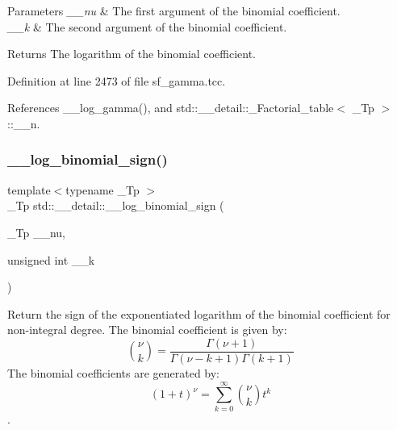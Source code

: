 \begin{DoxyParams}{Parameters}
{\em \+\_\+\+\_\+nu} & The first argument of the binomial coefficient. \\
\hline
{\em \+\_\+\+\_\+k} & The second argument of the binomial coefficient. \\
\hline
\end{DoxyParams}
\begin{DoxyReturn}{Returns}
The logarithm of the binomial coefficient. 
\end{DoxyReturn}


Definition at line 2473 of file sf\+\_\+gamma.\+tcc.



References \+\_\+\+\_\+log\+\_\+gamma(), and std\+::\+\_\+\+\_\+detail\+::\+\_\+\+Factorial\+\_\+table$<$ \+\_\+\+Tp $>$\+::\+\_\+\+\_\+n.

\mbox{\label{namespacestd_1_1____detail_aa89a8a5ced6325e1d64782f84e4ad95d}} 
\subsubsection{\texorpdfstring{\+\_\+\+\_\+log\+\_\+binomial\+\_\+sign()}{\_\_log\_binomial\_sign()}\hspace{0.1cm}{\footnotesize\ttfamily [1/2]}}
{\footnotesize\ttfamily template$<$typename \+\_\+\+Tp $>$ \\
\+\_\+\+Tp std\+::\+\_\+\+\_\+detail\+::\+\_\+\+\_\+log\+\_\+binomial\+\_\+sign (\begin{DoxyParamCaption}\item[{\+\_\+\+Tp}]{\+\_\+\+\_\+nu,  }\item[{unsigned int}]{\+\_\+\+\_\+k }\end{DoxyParamCaption})}



Return the sign of the exponentiated logarithm of the binomial coefficient for non-\/integral degree. The binomial coefficient is given by\+: \[ \binom{\nu}{k} = \frac{\Gamma(\nu+1)}{\Gamma(\nu-k+1) \Gamma(k+1)} \] The binomial coefficients are generated by\+: \[ \left(1 + t\right)^\nu = \sum_{k=0}^\infty \binom{\nu}{k} t^k \]. 


